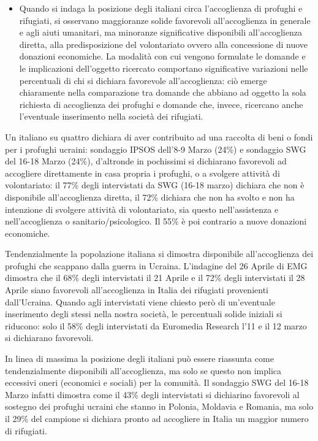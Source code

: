 \documentclass[
]{book}
\providecommand{\tightlist}{%
  \setlength{\itemsep}{0pt}\setlength{\parskip}{0pt}}
\begin{document}
\begin{itemize}
\tightlist
\item
  Quando si indaga la posizione degli italiani circa l'accoglienza di profughi e rifugiati, si osservano maggioranze solide favorevoli all'accoglienza in generale e agli aiuti umanitari, ma minoranze significative disponibili all'accoglienza diretta, alla predisposizione del volontariato ovvero alla concessione di nuove donazioni economiche.
  La modalità con cui vengono formulate le domande e le implicazioni dell'oggetto ricercato comportano significative variazioni nelle percentuali di chi si dichiara favorevole all'accoglienza: ciò emerge chiaramente nella comparazione tra domande che abbiano ad oggetto la sola richiesta di accoglienza dei profughi e domande che, invece, ricercano anche l'eventuale inserimento nella società dei rifugiati.
\end{itemize}

Un italiano su quattro dichiara di aver contribuito ad una raccolta di beni o fondi per i profughi ucraini: sondaggio IPSOS dell'8-9 Marzo (24\%) e sondaggio SWG del 16-18 Marzo (24\%), d'altronde in pochissimi si dichiarano favorevoli ad accogliere direttamente in casa propria i profughi, o a svolgere attività di volontariato: il 77\% degli intervistati da SWG (16-18 marzo) dichiara che non è disponibile all'accoglienza diretta, il 72\% dichiara che non ha svolto e non ha intenzione di svolgere attività di volontariato, sia questo nell'assistenza e nell'accoglienza o sanitario/psicologico. Il 55\% è poi contrario a nuove donazioni economiche.

Tendenzialmente la popolazione italiana si dimostra disponibile all'accoglienza dei profughi che scappano dalla guerra in Ucraina.
L'indagine del 26 Aprile di EMG dimostra che il 68\% degli intervistati il 21 Aprile e il 72\% degli intervistati il 28 Aprile siano favorevoli all'accoglienza in Italia dei rifugiati provenienti dall'Ucraina.
Quando agli intervistati viene chiesto però di un'eventuale inserimento degli stessi nella nostra società, le percentuali solide iniziali si riducono: solo il 58\% degli intervistati da Euromedia Research l'11 e il 12 marzo si dichiarano favorevoli.

In linea di massima la posizione degli italiani può essere riassunta come tendenzialmente disponibili all'accoglienza, ma solo se questo non implica eccessivi oneri (economici e sociali) per la comunità. Il sondaggio SWG del 16-18 Marzo infatti dimostra come il 43\% degli intervistati si dichiarino favorevoli al sostegno dei profughi ucraini che stanno in Polonia, Moldavia e Romania, ma solo il 29\% del campione si dichiara pronto ad accogliere in Italia un maggior numero di rifugiati.
\end{document}
